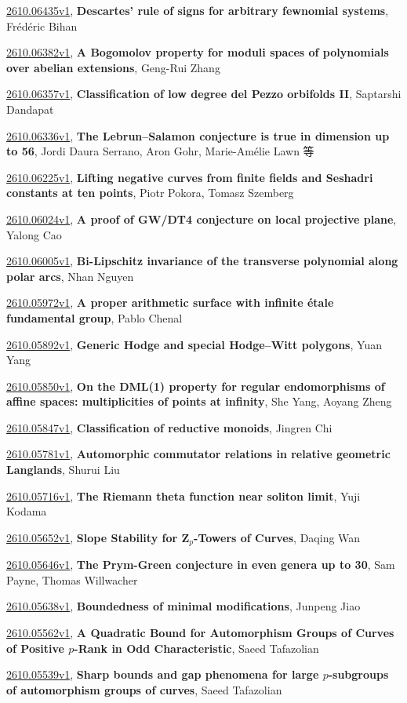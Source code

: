 \documentclass[9pt, a4paper]{article}
\theoremstyle{plain}
\theoremstyle{definition}
\theoremstyle{remark}
\newcommand{\arxiv}[3]{\href{https://arxiv.org/abs/#1}{#1}, \textbf{\textcolor{arxivblue}{#2}}, #3}
\begin{document}
\arxiv{2610.06435v1}{Descartes' rule of signs for arbitrary fewnomial systems}{Frédéric Bihan}

\arxiv{2610.06382v1}{A Bogomolov property for moduli spaces of polynomials over abelian extensions}{Geng-Rui Zhang}

\arxiv{2610.06357v1}{Classification of low degree del Pezzo orbifolds II}{Saptarshi Dandapat}

\arxiv{2610.06336v1}{The Lebrun--Salamon conjecture is true in dimension up to 56}{Jordi Daura Serrano, Aron Gohr, Marie-Amélie Lawn 等}

\arxiv{2610.06225v1}{Lifting negative curves from finite fields and Seshadri constants at ten points}{Piotr Pokora, Tomasz Szemberg}

\arxiv{2610.06024v1}{A proof of GW/DT4 conjecture on local projective plane}{Yalong Cao}

\arxiv{2610.06005v1}{Bi-Lipschitz invariance of the transverse polynomial along polar arcs}{Nhan Nguyen}

\arxiv{2610.05972v1}{A proper arithmetic surface with infinite étale fundamental group}{Pablo Chenal}

\arxiv{2610.05892v1}{Generic Hodge and special Hodge--Witt polygons}{Yuan Yang}

\arxiv{2610.05850v1}{On the DML(1) property for regular endomorphisms of affine spaces: multiplicities of points at infinity}{She Yang, Aoyang Zheng}

\arxiv{2610.05847v1}{Classification of reductive monoids}{Jingren Chi}

\arxiv{2610.05781v1}{Automorphic commutator relations in relative geometric Langlands}{Shurui Liu}

\arxiv{2610.05716v1}{The Riemann theta function near soliton limit}{Yuji Kodama}

\arxiv{2610.05652v1}{Slope Stability for ${\mathbf Z}_p$-Towers of Curves}{Daqing Wan}

\arxiv{2610.05646v1}{The Prym-Green conjecture in even genera up to 30}{Sam Payne, Thomas Willwacher}

\arxiv{2610.05638v1}{Boundedness of minimal modifications}{Junpeng Jiao}

\arxiv{2610.05562v1}{A Quadratic Bound for Automorphism Groups of Curves of Positive $p$-Rank in Odd Characteristic}{Saeed Tafazolian}

\arxiv{2610.05539v1}{Sharp bounds and gap phenomena for large $p$-subgroups of automorphism groups of curves}{Saeed Tafazolian}
\end{document}

